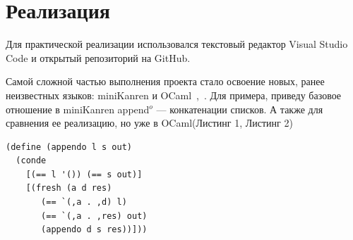 % 


% 





\section{Реализация}
Для практической реализации использовался текстовый редактор Visual Studio Code и открытый репозиторий на GitHub.

Самой сложной частью выполнения проекта стало освоение новых, ранее неизвестных языков: miniKanren и OCaml~\cite{reasoned_schemer},~\cite{prog_ocaml}.
Для примера, приведу базовое отношение в miniKanren append$^o$ --- конкатенации списков. А также для сравнения ее реализацию, но уже в OCaml(Листинг 1, Листинг 2)


\begin{lstlisting}[caption=Append$^o$ на Scheme (конкатенация двух списков), language=lisp, frame=single]
  (define (appendo l s out)
  (conde
    [(== l '()) (== s out)]
    [(fresh (a d res)
       (== `(,a . ,d) l)
       (== `(,a . ,res) out)
       (appendo d s res))])) 
\end{lstlisting}

